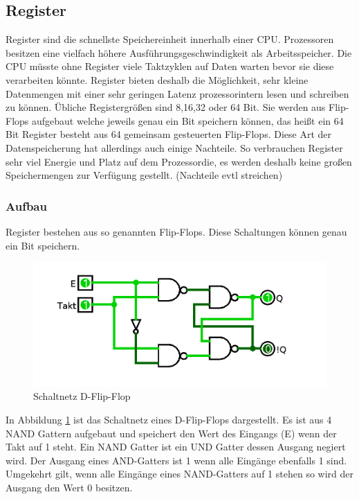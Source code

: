 \documentclass[12pt]{article}
\begin{document}
\subsection{Register}
Register sind die schnellste Speichereinheit innerhalb einer CPU. Prozessoren besitzen eine vielfach höhere Ausführungsgeschwindigkeit als Arbeitsspeicher. Die CPU müsste ohne Register viele Taktzyklen auf Daten warten bevor sie diese verarbeiten könnte. Register bieten deshalb die Möglichkeit, sehr kleine Datenmengen mit einer sehr geringen Latenz prozessorintern lesen und schreiben zu können. Übliche Registergrößen sind 8,16,32 oder 64 Bit.\cite{mikroprozessortechnik2011} Sie werden aus Flip-Flops aufgebaut welche jeweils genau ein Bit speichern können, das heißt ein 64 Bit Register besteht aus 64 gemeinsam gesteuerten Flip-Flops.\cite{mikroprozessortechnik2011} Diese Art der Datenspeicherung hat allerdings auch einige Nachteile. So verbrauchen Register sehr viel Energie und Platz auf dem Prozessordie, es werden deshalb keine großen Speichermengen zur Verfügung gestellt. (Nachteile evtl streichen)

\subsubsection{Aufbau}
Register bestehen aus so genannten Flip-Flops. Diese Schaltungen können genau ein Bit speichern. 

\begin{figure}[!htb]
\centering
\includegraphics[scale=0.30]{flipflop}
\caption{Schaltnetz D-Flip-Flop}
\centering
\label{fig:flipflop}
\end{figure}

In Abbildung \ref{fig:flipflop} ist das Schaltnetz eines D-Flip-Flops dargestellt. Es ist aus 4 NAND Gattern aufgebaut und speichert den Wert des Eingangs (E) wenn der Takt auf 1 steht. Ein NAND Gatter ist ein UND Gatter dessen Ausgang negiert wird. Der Ausgang eines AND-Gatters ist 1 wenn alle Eingänge ebenfalls 1 sind. Umgekehrt gilt, wenn alle Eingänge eines NAND-Gatters auf 1 stehen so wird der Ausgang den Wert 0 besitzen.
\end{document}
